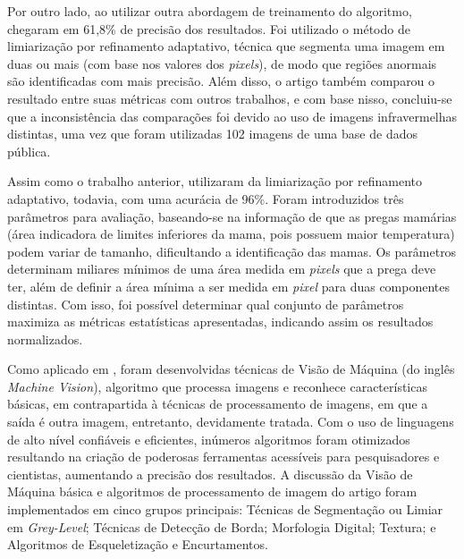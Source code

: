 Por outro lado,  ao utilizar outra abordagem de treinamento do algoritmo, chegaram em 61,8\% de precisão dos resultados. Foi utilizado o método de limiarização por refinamento adaptativo, técnica que segmenta uma imagem em duas ou mais (com base nos valores dos \textit{pixels}), de modo que regiões anormais são identificadas com mais precisão. Além disso, o artigo também comparou o resultado entre suas métricas com outros trabalhos, e com base nisso, concluiu-se que a inconsistência das comparações foi devido ao uso de imagens infravermelhas distintas, uma vez que foram utilizadas 102 imagens de uma base de dados pública.

Assim como o trabalho anterior,  utilizaram da limiarização por refinamento adaptativo, todavia, com uma acurácia de 96\%. Foram introduzidos três parâmetros para avaliação, baseando-se na informação de que as pregas mamárias (área indicadora de limites inferiores da mama, pois possuem maior temperatura) podem variar de tamanho, dificultando a identificação das mamas. Os parâmetros determinam miliares mínimos de uma área medida em \textit{pixels} que a prega deve ter, além de definir a área mínima a ser medida em \textit{pixel} para duas componentes distintas. Com isso, foi possível determinar qual conjunto de parâmetros maximiza as métricas estatísticas apresentadas, indicando assim os resultados normalizados.

Como aplicado em , foram desenvolvidas técnicas de Visão de Máquina (do inglês \textit{Machine Vision}), algoritmo que processa imagens e reconhece características básicas, em contrapartida à técnicas de processamento de imagens, em que a saída é outra imagem, entretanto, devidamente tratada. Com o uso de linguagens de alto nível confiáveis e eficientes, inúmeros algoritmos foram otimizados resultando na criação de poderosas ferramentas acessíveis para pesquisadores e cientistas, aumentando a precisão dos resultados. A discussão da Visão de Máquina básica e algoritmos de processamento de imagem do artigo foram implementados em cinco grupos principais: Técnicas de Segmentação ou Limiar em \textit{Grey-Level}; Técnicas de Detecção de Borda; Morfologia Digital; Textura; e Algoritmos de Esqueletização e Encurtamentos.


